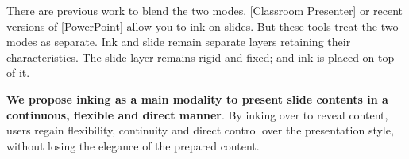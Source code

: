 There are previous work to blend the two modes. [Classroom Presenter] or recent versions of [PowerPoint] allow you to ink on slides. But these tools treat the two modes as separate. Ink and slide remain separate layers retaining their characteristics. The slide layer remains rigid and fixed; and ink is placed on top of it.

\textbf{We propose inking as a main modality to present slide contents in a continuous, flexible and direct manner}. By inking over to reveal content, users regain flexibility, continuity and direct control over the presentation style, without losing the elegance of the prepared content.  

